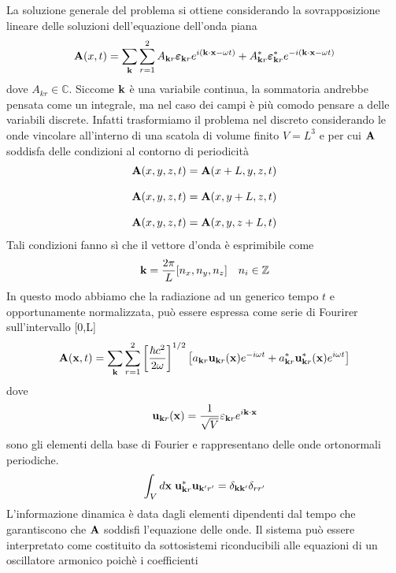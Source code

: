 La soluzione generale del problema si ottiene considerando la sovrapposizione lineare delle soluzioni dell'equazione dell'onda piana
\begin{equation}
	\bold{A}(x,t) = \sum_{\bold{k}}\sum_{r=1}^2 A_{\bold{k}r}\boldsymbol{\varepsilon}_{\bold{k}r}e^{i(\bold{k} \cdot \bold{x}-\omega t)} + A^*_{\bold{k}r} \boldsymbol{\varepsilon}^*_{\bold{k}r}e^{-i(\bold{k}\cdot \bold{x} - \omega t)}
\end{equation} 
\newpage
dove $A_{kr} \in \mathbb{C}$. Siccome $\bold{k}$ \`e una variabile continua, la sommatoria andrebbe pensata come un integrale, ma nel caso dei campi \`e pi\`u comodo pensare a delle variabili discrete. Infatti trasformiamo il problema nel discreto considerando le onde vincolare all'interno di una scatola di volume finito $V = L^3$ e per cui $\bold{A}$ soddisfa delle condizioni al contorno di periodicit\`a
\begin{align*}
	& \bold{A}(x,y,z,t) = \bold{A}(x+L,y,z,t) \\[0.3cm]
	& \bold{A}(x,y,z,t) = \bold{A}(x,y+L,z,t) \\[0.3cm]
	& \bold{A}(x,y,z,t) = \bold{A}(x,y,z+L,t) 
\end{align*}
Tali condizioni fanno s\`i che il vettore d'onda \`e esprimibile come
\begin{equation*}
	\bold{k} = \frac{2 \pi}{L}[n_x,n_y,n_z] \quad n_i \in \mathbb{Z}
\end{equation*}
In questo modo abbiamo che la radiazione ad un generico tempo $t$ e opportunamente normalizzata, pu\`o essere espressa come serie di Fourirer sull'intervallo [0,L]
\begin{equation}
	\bold{A}(\bold{x},t) = \sum_{\bold{k}} \sum_{r =1}^2 \left[ \frac{\hbar c^2}{2 \omega}\right]^{1/2} \left[ a_{\bold{k}r} \bold{u}_{\bold{k}r}(\bold{x})e^{-i \omega t}+ a_{\bold{k}r}^*\bold{u}_{\bold{k}r}^*(\bold{x})e^{i\omega t}\right]
\end{equation}
dove 
\begin{equation*}
	\bold{u}_{\bold{k}r}(\bold{x}) = \frac{1}{\sqrt{V}}\varepsilon_{\bold{k}r}e^{i\bold{k} \cdot \bold{x}}
\end{equation*}
sono gli elementi della base di Fourier e rappresentano delle onde ortonormali periodiche.
\begin{equation*}
	\int_V d\bold{x} \; \bold{u}_{\bold{k}r}^*\bold{u}_{\bold{k}'r'} = \delta_{\bold{k}\bold{k}'}\delta_{rr'}
\end{equation*}
L'informazione dinamica \`e data dagli elementi dipendenti dal tempo che garantiscono che $\bold{A}$ soddisfi l'equazione delle onde. Il sistema pu\`o essere interpretato come costituito da sottosistemi riconducibili alle equazioni di un oscillatore armonico poich\`e i coefficienti 
